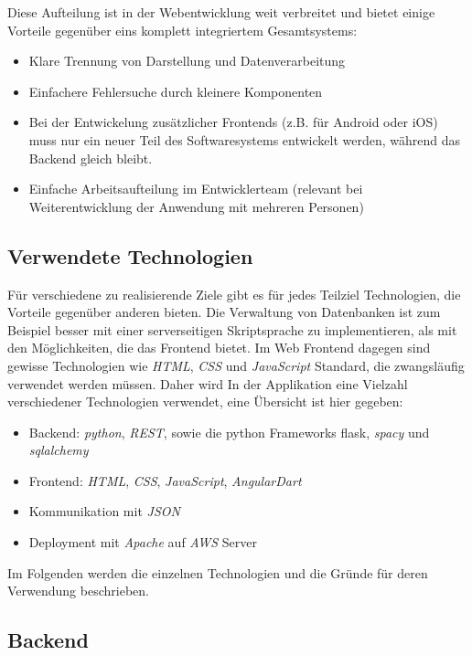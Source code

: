Diese Aufteilung ist in der Webentwicklung weit verbreitet  und bietet einige Vorteile gegenüber eins komplett integriertem Gesamtsystems:

\begin{itemize}
	\item Klare Trennung von Darstellung und Datenverarbeitung
	\item Einfachere Fehlersuche durch kleinere Komponenten
	\item Bei der Entwickelung zusätzlicher Frontends (z.B. für Android oder iOS) muss nur ein neuer Teil des Softwaresystems entwickelt werden, während das Backend gleich bleibt.
	\item Einfache Arbeitsaufteilung im Entwicklerteam (relevant bei Weiterentwicklung der Anwendung mit mehreren Personen)
\end{itemize}

\subsection{Verwendete Technologien}
Für verschiedene zu realisierende Ziele gibt es für jedes Teilziel Technologien, die Vorteile gegenüber anderen bieten. Die Verwaltung von Datenbanken ist zum Beispiel besser mit einer serverseitigen Skriptsprache zu implementieren, als mit den Möglichkeiten, die das Frontend bietet. Im Web Frontend dagegen sind gewisse Technologien wie \textit{HTML}, \textit{CSS} und \textit{JavaScript} Standard, die zwangsläufig verwendet werden müssen. Daher wird In der Applikation eine Vielzahl verschiedener Technologien verwendet, eine Übersicht ist hier gegeben:

\begin{itemize}
	\item Backend: \textit{python}, \textit{REST}, sowie die python Frameworks fla\textit{}sk, \textit{spacy} und \textit{sqlalchemy}
	\item Frontend: \textit{HTML}, \textit{CSS}, \textit{JavaScript}, \textit{AngularDart}
	\item Kommunikation mit \textit{JSON}
	\item Deployment mit \textit{Apache} auf \textit{AWS} Server
\end{itemize}

Im Folgenden werden die einzelnen Technologien und die Gründe für deren Verwendung beschrieben.

\subsection{Backend}

